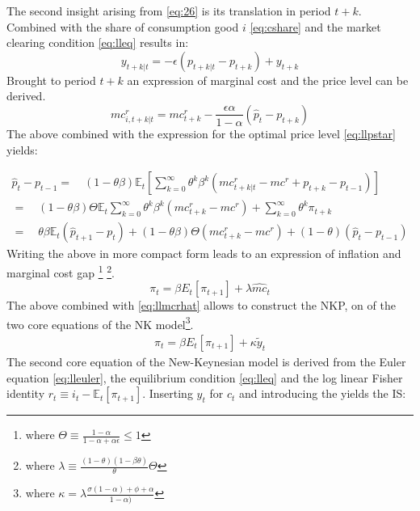 \documentclass[12pt,a4paper,english]{article} %
\newcommand{\E}{\mathbb{E}} %
\begin{document}
	The second insight arising from \eqref{eq:26} is its translation in period $t+k$. Combined with the share of consumption good $i$ \eqref{eq:cshare} and the market clearing condition \eqref{eq:lleq} results in:
	\begin{equation}
		y_{t+k|t} = -\epsilon(p_{t+k|t} - p_{t+k}) + y_{t+k}
	\end{equation}
	Brought to period $t+k$ an expression of marginal cost and the price level can be derived.
	\begin{equation}
		mc_{i, t+k|t}^r = mc_{t+k}^r - \frac{\epsilon \alpha}{1 - \alpha}(\hat{p}_t - p_{t+k})
	\end{equation}
	The above combined with the expression for the optimal price level \eqref{eq:llpstar} yields:

	\begin{equation}
		\begin{aligned}
			\hat{p}_t - p_{t-1} =
			\quad
			(1 - \theta \beta) \E_t
			\left[
			\sum_{k=0}^{\infty} \theta^k \beta^k \left( mc_{t+k|t}^r - mc^r +p_{t+k} - p_{t-1}\right)
			\right] \\			
			=
			\quad
			(1 - \theta \beta) \Theta \E_t
			\sum_{k=0}^{\infty} \theta^k \beta^k (mc_{t+k}^r - mc^r) + 
			\sum_{k=0}^{\infty} \theta^k \pi_{t+k} \\
			=
			\quad
			\theta \beta \E_t (\hat{p}_{t+1} - p_{t}) + (1 - \theta \beta) \Theta (mc_{t+k}^r - mc^r) + (1 - \theta) (\hat{p}_t - p_{t-1})
		\end{aligned}		
	\end{equation} 
	Writing the above in more compact form leads to an expression of inflation and marginal cost gap \footnote{where $\Theta \equiv \frac{1 - \alpha}{1 - \alpha + \alpha \epsilon} \leq 1$} \footnote{	where $\lambda \equiv \frac{(1-\theta)(1-\beta\theta)}{\theta} \Theta$}.
	\begin{equation}
		\pi_t = \beta E_t [\pi_{t+1}] + \lambda \hat{mc}_{t}
	\end{equation}
	The above combined with \eqref{eq:llmcrhat} allows to construct the \ac{NKP}, on of the two core equations of the NK model\footnote{where $\kappa = \lambda \frac{\sigma (1 - \alpha) + \phi + \alpha}{1 - \alpha)}$}.
	\begin{equation} \label{eq:llnkp}
		\begin{aligned}
			\pi_t = \beta E_t [\pi_{t+1}] + \kappa \tilde{y}_t
		\end{aligned}
	\end{equation}
	The second core equation of the New-Keynesian model is derived from the Euler equation \eqref{eq:lleuler}, the equilibrium condition \eqref{eq:lleq} and the log linear Fisher identity $r_t \equiv i_t - \E_t[\pi_{t+1}]$. Inserting $y_t$ for $c_t$ and introducing the yields the \ac{IS}:
\end{document}
